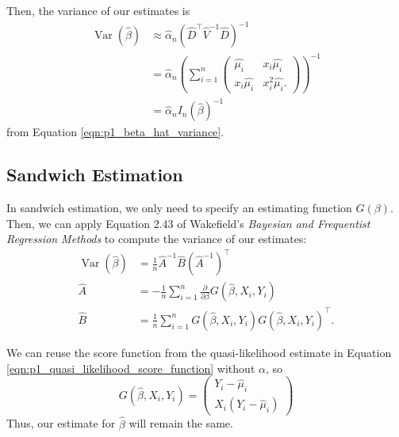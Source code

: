 \documentclass[letterpaper,11pt]{article}
\begin{document}
\begin{enumerate}
\begin{description}
    Then, the variance of our estimates is
    \begin{align}
      \operatorname{Var}\left(
      \hat{\beta}
      \right)
      &\approx
      \hat{\alpha}_n\left(\hat{D}^\intercal \hat{V}^{-1} \hat{D}\right)^{-1} \nonumber\\
      &= \hat{\alpha}_n\left(\sum_{i=1}^n
        \begin{pmatrix}
          \hat{\mu_i} & x_i\hat{\mu_i} \\
          x_i\hat{\mu_i} & x_i^2\hat{\mu_i}.
        \end{pmatrix}\right)^{-1}
        \nonumber\\
      &= \hat{\alpha}_nI_n\left(\hat{\beta}\right)^{-1}
        \label{eqn:p1_beta_hat_quasi_variance}
    \end{align}
    from Equation \ref{eqn:p1_beta_hat_variance}.

    \subsection*{Sandwich Estimation}

    In sandwich estimation, we only need to specify an estimating function
    $G\left(\beta\right)$. Then, we can apply Equation 2.43 of Wakefield's
    \emph{Bayesian and Frequentist Regression Methods} to compute the variance
    of our estimates:
    \begin{align}
      \operatorname{Var}\left(\hat{\beta}\right)
      &= \frac{1}{n}\hat{A}^{-1}\hat{B}\left(\hat{A}^{-1}\right)^\intercal \nonumber\\
      \hat{A}
      &= -\frac{1}{n}\sum_{i=1}^n
        \frac{\partial}{\partial\beta}G\left(\hat{\beta}, X_i, Y_i\right) \nonumber\\
      \hat{B}
      &= \frac{1}{n}\sum_{i=1}^n
        G\left(\hat{\beta}, X_i, Y_i\right)G\left(\hat{\beta}, X_i, Y_i\right)^\intercal.
        \nonumber
    \end{align}

    We can reuse the score function from the quasi-likelihood estimate in
    Equation \ref{eqn:p1_quasi_likelihood_score_function} without $\alpha$, so
    \begin{equation}
      G\left(\hat{\beta}, X_i, Y_i\right)
      = \begin{pmatrix}
        Y_i - \hat{\mu}_i \\
        X_i\left(Y_i - \hat{\mu}_i\right)
      \end{pmatrix}
    \end{equation}
    Thus, our estimate for $\hat{\beta}$ will remain the same.


\end{description}
\end{enumerate}
\end{document}
